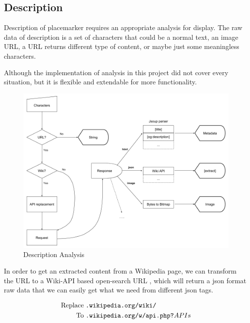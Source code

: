 \subsection{Description}

Description of placemarker requires an appropriate analysis for display. The raw data of description is a set of characters that could be a normal text, an image URL, a URL returns different type of content, or maybe just some meaningless characters.

Although the implementation of analysis in this project did not cover every situation, but it is flexible and extendable for more functionality.

\begin{figure}[H]
\caption{Description Analysis}
\label{fig:description-analysis}
\centering
\includegraphics[width=\linewidth]{Figures/description-analysis.png}
\decoRule
\end{figure}

In order to get an extracted content from a Wikipedia page, we can transform the URL to a Wiki-API based open-search URL \cite{wiki.api.2016}, which will return a json format raw data that we can easily get what we need from different json tags.

\[
\begin{array}{lr}
\begin{aligned}
\text{Replace}\;&\texttt{.wikipedia.org/wiki/}\\
\text{To}\;&\texttt{.wikipedia.org/w/api.php?}APIs\\
\end{aligned}
\end{array}
\]


